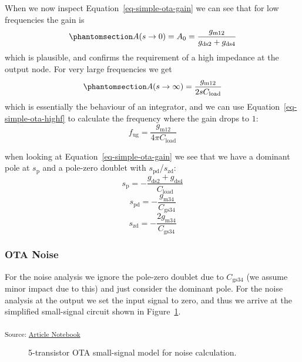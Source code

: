 \documentclass[
  a4paper,
  DIV=11,
  numbers=noendperiod]{scrartcl}
\begin{document}
When we now inspect Equation~\ref{eq-simple-ota-gain} we can see that
for low frequencies the gain is
\begin{equation}\phantomsection\label{eq-simple-ota-gain-dc}{
A(s \rightarrow 0) = A_0 = \frac{g_\mathrm{m12}}{g_\mathrm{ds2} + g_\mathrm{ds4}}
}\end{equation} which is plausible, and confirms the requirement of a
high impedance at the output node. For very large frequencies we get
\begin{equation}\phantomsection\label{eq-simple-ota-highf}{
A (s \rightarrow \infty) = \frac{g_\mathrm{m12}}{2 s C_\mathrm{load}}
}\end{equation} which is essentially the behaviour of an integrator, and
we can use Equation~\ref{eq-simple-ota-highf} to calculate the frequency
where the gain drops to \(1\): \[
f_\mathrm{ug} = \frac{g_\mathrm{m12}}{4 \pi C_\mathrm{load}}
\]

when looking at Equation~\ref{eq-simple-ota-gain} we see that we have a
dominant pole at \(s_\mathrm{p}\) and a pole-zero doublet with
\(s_\mathrm{pd}\)/\(s_\mathrm{zd}\): \[
s_\mathrm{p} = -\frac{g_\mathrm{ds2} + g_\mathrm{ds4}}{C_\mathrm{load}}
\] \[
s_\mathrm{pd} = -\frac{g_\mathrm{m34}}{C_\mathrm{gs34}}
\] \[
s_\mathrm{zd} = -\frac{2 g_\mathrm{m34}}{C_\mathrm{gs34}}
\]

\subsubsection{OTA Noise}\label{ota-noise}

For the noise analysis we ignore the pole-zero doublet due to
\(C_\mathrm{gs34}\) (we assume minor impact due to this) and just
consider the dominant pole. For the noise analysis at the output we set
the input signal to zero, and thus we arrive at the simplified
small-signal circuit shown in
Figure~\ref{fig-basic-ota-small-signal-noise}.

\textsubscript{Source:
\href{https://iic-jku.github.io/analog-circuit-design/index.qmd.html}{Article
Notebook}}

\begin{figure}[H]


\caption{\label{fig-basic-ota-small-signal-noise}5-transistor OTA
small-signal model for noise calculation.}

\end{figure}%
\end{document}
